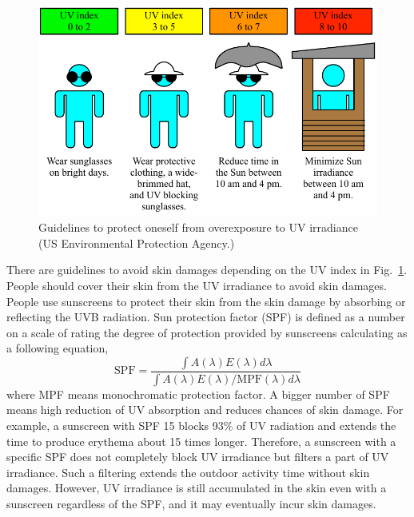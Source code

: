 \documentclass[journal]{IEEEtran}
\begin{document}
\begin{figure}
\centering
\includegraphics[width=1.0\hsize]{Figures/UVI_guideline.pdf}
\caption{Guidelines to protect oneself from overexposure to UV irradiance (US Environmental Protection Agency.)}
\label{fig:guidelines}
\vskip -10pt
\end{figure}      

There are guidelines to avoid skin damages depending on the UV index in Fig.~\ref{fig:guidelines}. 
People should cover their skin from the UV irradiance to avoid skin damages.
%
People use sunscreens to protect their skin from the skin damage by absorbing or reflecting the UVB radiation. 
Sun protection factor (SPF) is defined as a number on a scale of rating the degree of protection provided by sunscreens calculating as a following equation,
%
\begin{equation} 
\text{SPF} = \frac{\int A(\lambda)E(\lambda) d \lambda}{\int A(\lambda)E(\lambda) / \text{MPF}(\lambda) d \lambda}
 \end{equation}
%
where MPF means monochromatic protection factor.
A bigger number of SPF means high reduction of UV absorption and reduces chances of skin damage. 
For example, a sunscreen with SPF 15 blocks 93\% of UV radiation and extends the time to produce erythema about 15 times longer.
Therefore, a sunscreen with a specific SPF does not completely block UV irradiance but filters a part of UV irradiance. 
Such a filtering extends the outdoor activity time without skin damages.
However, UV irradiance is still accumulated in the skin even with a sunscreen regardless of the SPF, and it may eventually incur skin damages.
\end{document}
